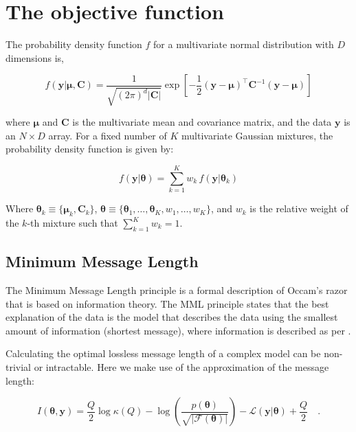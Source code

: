 \documentclass{article}
\newcommand{\vect}[1]{\boldsymbol{\mathbf{#1}}}
\def\veccov{\vect{C}}
\def\vecmean{\vect{\mu}}
\def\vectheta{\vect{\theta}}
\def\weight{w}
\def\datum{y}
\def\data{\vect{\datum}}
\def\likelihood{\mathcal{L}}
\begin{document}
\section{The objective function}
\label{sec:objective-function}


\noindent{}The probability density function $f$ for a multivariate normal 
distribution with $D$ dimensions is,

\begin{equation}
  f(\data|\vecmean,\veccov) 
      = \frac{1}{\sqrt{(2\pi)^d|\veccov|}}
        \exp{\left[-\frac{1}{2}(\data - \vecmean)^\intercal\veccov^{-1}(\data - \vecmean)\right]}
\end{equation}

\noindent{}where $\vecmean$ and $\veccov$ is the multivariate mean and 
covariance matrix, and the data $\data$ is an $N\times{}D$ array.
For a fixed number of $K$ multivariate Gaussian mixtures, the probability
density function is given by:

\begin{equation}
  f(\data|\vectheta) = \sum_{k=1}^{K} \weight_k \, f(\data|\vectheta_k)
\end{equation}

\noindent{}Where $\vectheta_k \equiv \{\vecmean_k, \veccov_k\}$,
$\vectheta \equiv \{\vectheta_1,\dots,\vectheta_K,\weight_1,\dots,\weight_K\}$, 
and $\weight_k$ is the relative weight of the $k$-th mixture such that
$\sum_{k=1}^{K}\weight_k = 1$.


\subsection{Minimum Message Length}
\label{sec:mml}

The Minimum Message Length \citep[MML;][]{Wallace_1968} principle is a formal
description of Occam's razor that is based on information theory.
The MML principle states that the best explanation of the data is the model
that describes the data using the smallest amount of information (shortest
message), where information is described as per \citet{Shannon_1948}. 


Calculating the optimal lossless message length of a complex model can be
non-trivial or intractable. Here we make use of the \citet{Wallace_1987}
approximation of the message length:

\begin{equation}
\label{eq:message-length}
  I(\vectheta,\data) 
    = \frac{Q}{2}\log\kappa{\left(Q\right)} 
    - \log{\left(\frac{p(\vectheta)}{\sqrt{|\mathcal{F}(\vectheta)|}}\right)}
    - \likelihood\left(\data|\vectheta\right) 
    + \frac{Q}{2} \quad .
\end{equation}
\end{document}
